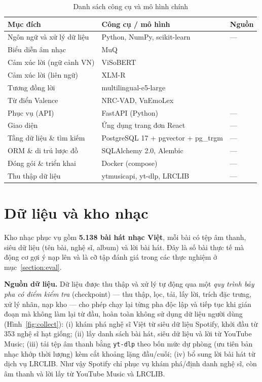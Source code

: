 \documentclass[../DoAn.tex]{subfiles}
\begin{document}
\begin{table}[h!]
\centering
\caption{Danh sách công cụ và mô hình chính}
\label{table:tools}
\begin{tabular}{p{4.2cm} p{4.0cm} p{3.2cm}}
\toprule
\textbf{Mục đích} & \textbf{Công cụ / mô hình} & \textbf{Nguồn} \\
\midrule
Ngôn ngữ và xử lý dữ liệu & Python, NumPy, scikit-learn & --- \\
Biểu diễn âm nhạc & MuQ & \cite{zhu2025muq} \\
Cảm xúc lời (ngữ cảnh VN) & ViSoBERT & \cite{nguyen2023visobert} \\
Cảm xúc lời (liên ngữ) & XLM-R & \cite{conneau2020xlmr} \\
Tương đồng lời & multilingual-e5-large & \cite{wang2024e5} \\
Từ điển Valence & NRC-VAD, VnEmoLex & \cite{mohammad2018nrcvad, doan2022vnemolex} \\
Phục vụ (API) & FastAPI (Python) & --- \\
Giao diện & Ứng dụng trang đơn React & --- \\
Tầng dữ liệu \& tìm kiếm & PostgreSQL 17 + pgvector + pg\_trgm & --- \\
ORM \& di trú lược đồ & SQLAlchemy 2.0, Alembic & --- \\
Đóng gói \& triển khai & Docker (compose) & --- \\
Thu thập dữ liệu & ytmusicapi, yt-dlp, LRCLIB & --- \\
\bottomrule
\end{tabular}
\end{table}

\section{Dữ liệu và kho nhạc}
\label{section:data}
Kho nhạc phục vụ gồm \textbf{5.138 bài hát nhạc Việt}, mỗi bài có tệp âm thanh, siêu dữ liệu (tên bài, nghệ sĩ, album) và lời bài hát. Đây là số bài thực tế mà động cơ gợi ý nạp lên và là cỡ tập đánh giá trong các thực nghiệm ở mục~\ref{section:eval}.

\textbf{Nguồn dữ liệu.} Dữ liệu được thu thập và xử lý tự động qua một \textit{quy trình bảy pha có điểm kiểm tra} (checkpoint) --- thu thập, lọc, tải, lấy lời, trích đặc trưng, xử lý nhãn, nạp kho --- cho phép chạy lại từng pha độc lập và tiếp tục khi gián đoạn mà không làm lại từ đầu, hoàn toàn không sử dụng dữ liệu người dùng (Hình~\ref{fig:collect}): (i) khám phá nghệ sĩ Việt từ siêu dữ liệu Spotify, khởi đầu từ 353 nghệ sĩ hạt giống; (ii) lấy danh sách bài hát, siêu dữ liệu và lời từ YouTube Music; (iii) tải tệp âm thanh bằng \texttt{yt-dlp} theo bốn mức dự phòng (ưu tiên bản nhạc khớp thời lượng) kèm cắt khoảng lặng đầu/cuối; (iv) bổ sung lời bài hát từ dịch vụ LRCLIB. Như vậy Spotify chỉ phục vụ khám phá/định danh nghệ sĩ, còn âm thanh và lời lấy từ YouTube Music và LRCLIB.
\end{document}
